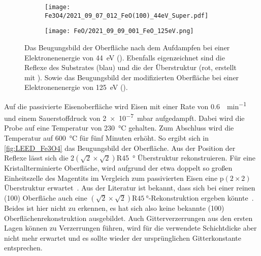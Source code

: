         \begin{figure}
            \begin{subfigure}[t]{0.48\textwidth}
                \centering
                \texttt{[image: Fe3O4/2021\_09\_07\_012\_FeO(100)\_44eV\_Super.pdf]}
                \subcaption{}
                \label{fig:LEED_Fe3O4}
            \end{subfigure}
            \begin{subfigure}[t]{0.48\textwidth}
                \centering
                \texttt{[image: FeO/2021\_09\_09\_001\_FeO\_125eV.png]}
                \subcaption{}
                \label{fig:LEED_FeO}
            \end{subfigure}
            \caption{Das Beugungsbild der Oberfläche nach dem Aufdampfen bei einer Elektronenenergie von \SI{44}{\electronvolt} ().
            Ebenfalls eigenzeichnet sind die Reflexe des Substrates (blau) und die der Überstruktur (rot, erstellt mit \cite{SpotPlotter}).
            Sowie das Beugungsbild der modifizierten Oberfläche bei einer Elektronenenergie von \SI{125}{\electronvolt} ().}
        \end{figure}
        Auf die passivierte Eisenoberfläche wird Eisen mit einer Rate von \SI{0.6}{\ML\per\minute} und einem Sauerstoffdruck von \SI{2e-7}{\milli\bar} aufgedampft.
        Dabei wird die Probe auf eine Temperatur von \SI{230}{\celsius} gehalten.
        Zum Abschluss wird die Temperatur auf \SI{600}{\celsius} für fünf Minuten erhöht.
        So ergibt sich in \autoref{fig:LEED_Fe3O4} das Beugungsbild der Oberfläche.
        Aus der Position der Reflexe lässt sich die $2\left(\sqrt{2}\times\sqrt{2}\right)$R\SI{45}{\degree} Überstruktur rekonstruieren.
        Für eine Kristallterminierte Oberfläche, wird aufgrund der etwa doppelt so großen Einheitszelle des Magentits im Vergleich zum passivierten Eisen eine p$(2\times2)$ Überstruktur erwartet~\cite{FeO_1}.
        Aus der Literatur ist bekannt, dass sich bei einer reinen (100) Oberfläche auch eine $\left(\sqrt{2}\times\sqrt{2}\right)\text{R}\SI{45}{\degree}$-Rekonstruktion ergeben könnte~\cite{ruwisch_vsm-untersuchung_2016}.
        Beides ist hier nicht zu erkennen, es hat sich also keine bekannte (100) Oberflächenrekonstruktion ausgebildet.
        Auch Gitterverzerrungen aus den ersten Lagen können zu Verzerrungen führen, wird für die verwendete Schichtdicke aber nicht mehr erwartet und es sollte wieder der ursprünglichen Gitterkonstante entsprechen.


